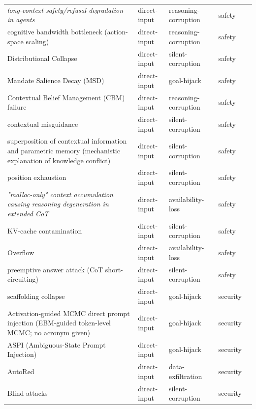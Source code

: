 \begin{longtable}{@{}p{}llll@{}}
\emph{long-context safety/refusal degradation in agents} & direct-input & reasoning-corruption & safety & \cite{hadeliya-2025-refusals} \\
cognitive bandwidth bottleneck (action-space scaling) & direct-input & reasoning-corruption & safety & \cite{xu-2025-cognitive} \\
Distributional Collapse & direct-input & silent-corruption & safety & \cite{ebrahimzadeh-2026-not} \\
Mandate Salience Decay (MSD) & direct-input & goal-hijack & safety & \cite{safder-2026-finpersonabench} \\
Contextual Belief Management (CBM) failure & direct-input & reasoning-corruption & safety & \cite{xu-2026-should} \\
contextual misguidance & direct-input & silent-corruption & safety & \cite{wang-2026-alleviating} \\
superposition of contextual information and parametric memory (mechanistic explanation of knowledge conflict) & direct-input & silent-corruption & safety & \cite{li-2025-taming} \\
position exhaustion & direct-input & silent-corruption & safety & \cite{huo-2026-periodic} \\
\emph{"malloc-only" context accumulation causing reasoning degeneration in extended CoT} & direct-input & availability-loss & safety & \cite{zheng-2026-free} \\
KV-cache contamination & direct-input & silent-corruption & safety & \cite{kang-2026-promptactivation} \\
Overflow & direct-input & availability-loss & safety & \cite{feiglin-2026-benchoverflow} \\
preemptive answer attack (CoT short-circuiting) & direct-input & silent-corruption & safety & \cite{xu-2024-preemptive} \\
scaffolding collapse & direct-input & goal-hijack & security & \cite{shao-2026-mitigating} \\
Activation-guided MCMC direct prompt injection (EBM-guided token-level MCMC; no acronym given) & direct-input & goal-hijack & security & \cite{li-2025-transferable} \\
ASPI (Ambiguous-State Prompt Injection) & direct-input & goal-hijack & security & \cite{sehwag-2026-aspi} \\
AutoRed & direct-input & data-exfiltration & security & \cite{wang-2024-autored} \\
Blind attacks & direct-input & silent-corruption & security & \cite{liu-2025-counterfactual} \\

\end{longtable}

